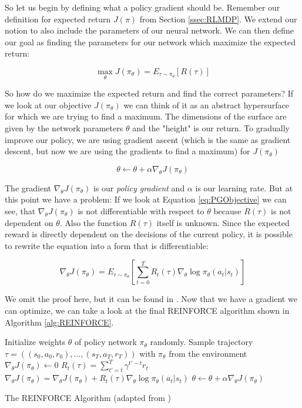 So let us begin by defining what a policy gradient should be. Remember our definition for expected return $J(\pi)$ from Section \ref{ssec:RLMDP}. We extend our notion to also include the parameters of our neural network. We can then define our goal as finding the parameters for our network which maximize the expected return:  

\begin{equation} \label{eq:PGObjective}
  \max_\theta J(\pi_\theta) =  E_{\tau\sim\pi_\theta}\left[R(\tau) \right]
\end{equation}

So how do we maximize the expected return and find the correct parameters? If we look at our objective $J(\pi_\theta)$ we can think of it as an abstract hypersurface for which we are trying to find a maximum. The dimensions of the surface are given by the network parameters $\theta$ and the "height" is our return. To gradually improve our policy, we are using gradient ascent (which is the same as gradient descent, but now we are using the gradients to find a maximum) for $J(\pi_\theta)$

\[\theta \leftarrow \theta + \alpha \nabla_\theta J(\pi_\theta)\]

The gradient $\nabla_\theta J(\pi_\theta)$ is our \textit{policy gradient} and $\alpha$ is our learning rate. But at this point we have a problem: If we look at Equation \ref{eq:PGObjective} we can see, that $\nabla_\theta J(\pi_\theta)$ is not differentiable with respect to $\theta$ because $R(\tau)$ is not dependent on $\theta$. Also the function $R(\tau)$ itself is unknown. Since the expected reward is directly dependent on the decisions of the current policy, it is possible to rewrite the equation into a form that is differentiable:

\begin{equation} \label{eq:PGEstimation}
  \nabla_\theta J(\pi_\theta) = E_{\tau \sim \pi_\theta} \left[\sum^T_{t=0}R_t(\tau) \nabla_\theta \log \pi_\theta(a_t|s_t)\right]
\end{equation}

We omit the proof here, but it can be found in \cite{foundations2019graesser}. Now that we have a gradient we can optimize, we can take a look at the final REINFORCE algorithm shown in Algorithm \ref{alg:REINFORCE}.

\begin{algorithm}[ht]
  Initialize weights $\theta$ of policy network $\pi_\theta$ randomly. \;
   {
   Sample trajectory $\tau = ((s_0, a_0, r_0), \dots, (s_T, a_T, r_T))$ with $\pi_\theta$ from the environment \;
   $\nabla_\theta J(\pi_\theta) \leftarrow 0$ \;
     {
    $R_t(\tau) = \sum^T_{t'=t} \gamma^{t'-t}r_t$ \;
    $\nabla_\theta J(\pi_\theta) = \nabla_\theta J(\pi_\theta) + R_t(\tau)\nabla_\theta \log \pi_\theta(a_t|s_t)$ \;
   }
  $\theta \leftarrow \theta + \alpha \nabla_\theta J(\pi_\theta)$
 }
  \caption[The REINFORCE Algorithm]{The REINFORCE Algorithm (adapted from \cite{foundations2019graesser})}\label{alg:REINFORCE}
 \end{algorithm}

